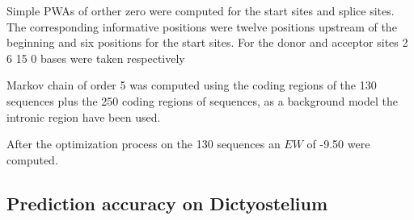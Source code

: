 


Simple PWAs of orther zero were computed for the start sites and splice
sites. The corresponding informative positions were twelve positions
upstream of the beginning and six positions for the start sites. For
the donor and acceptor sites 2 6 15 0 bases were taken respectively

Markov chain of order 5 was computed using the coding regions of the
130 sequences plus the 250 coding regions of sequences, as a
background model the intronic region have been used.

After the optimization process on the 130 sequences an $EW$ of
-9.50 were computed.


\subsection*{Prediction accuracy on Dictyostelium}

